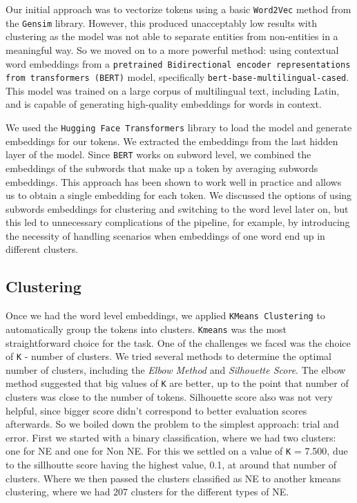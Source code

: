 \documentclass[11pt]{article}
\begin{document}
Our initial approach was to vectorize tokens using a basic \texttt{Word2Vec} method from the \texttt{Gensim} library. However, this produced 
unacceptably low results with clustering as the model was not able to separate entities from non-entities in a meaningful way. So we moved on to
a more powerful method: using contextual word embeddings from a \texttt{pretrained Bidirectional encoder representations from transformers (BERT)} model,
specifically \texttt{bert-base-multilingual-cased}. This model was trained on a large corpus of multilingual text, including Latin, and is
capable of generating high-quality embeddings for words in context.

We used the \texttt{Hugging Face Transformers} library to load the model and generate embeddings for our tokens. We extracted the embeddings
from the last hidden layer of the model. Since \texttt{BERT} works on subword level, we combined the embeddings of the subwords that make up
a token by averaging subwords embeddings. This approach has been shown to work well in practice and allows us to obtain a single embedding for
each token. We discussed the options of using subwords embeddings for clustering and switching to the word level later on, but this led to
unnecessary complications of the pipeline, for example, by introducing the necessity of handling scenarios when embeddings of one word end up
in different clusters.

\subsection{Clustering}

Once we had the word level embeddings, we applied \texttt{KMeans Clustering} to automatically group the tokens into clusters. \texttt{Kmeans}
was the most straightforward choice for the task. One of the challenges we faced was the choice of \texttt{K} - number of clusters. We tried
several methods to determine the optimal number of clusters, including the \textit{Elbow Method} and \textit{Silhouette Score}. 
The elbow method suggested that big values of \texttt{K} are better, up to the point that number of clusters was close to the number of tokens.
Silhouette score also was not very helpful, since bigger score didn't correspond to better evaluation scores afterwards. So we boiled down the
problem to the simplest approach: trial and error.
First we started with a binary classification, where we had two clusters: one for NE and one for Non NE. For this we settled on a value of
\texttt{K} = 7.500, due to the sillhoutte score having the highest value, 0.1, at around that number of clusters. Where we then passed the clusters
classified as NE to another kmeans clustering, where we had 207 clusters for the different types of NE.
\end{document}
